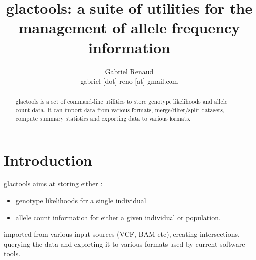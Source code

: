 \documentclass[a4paper]{article}
\title{glactools: a suite of utilities for the management of allele frequency information}
\author{Gabriel Renaud \\
gabriel [dot] reno [at]  gmail.com}
\date{}
\begin{document}
\maketitle

\begin{abstract}
glactools is a set of command-line utilities to store genotype likelihoods and allele count data. It can import data from various formats, merge/filter/split datasets, compute summary statistics and exporting data to various formats.
\end{abstract}

\tableofcontents

\section{Introduction}

glactools aims at storing either :
\begin{itemize}
\item genotype likelihoods for a single individual 
\item allele count information for either a given individual or population.
\end{itemize}
imported from various input sources (VCF, BAM etc), creating intersections, querying the data and exporting it to various formats used by current software tools.
\end{document}
